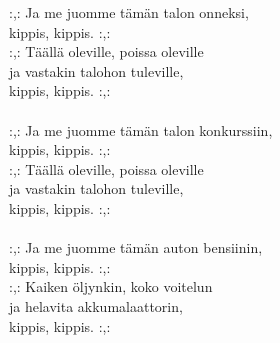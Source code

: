 
:,: Ja me juomme tämän talon onneksi, \\ kippis, kippis. :,: \\ :,: Täällä oleville, poissa oleville \\ ja vastakin talohon tuleville, \\ kippis, kippis. :,: \\ \hspace{10mm} \\ :,: Ja me juomme tämän talon konkurssiin, \\ kippis, kippis. :,: \\ :,: Täällä oleville, poissa oleville \\ ja vastakin talohon tuleville, \\ kippis, kippis. :,: \\ \hspace{10mm} \\ :,: Ja me juomme tämän auton bensiinin, \\ kippis, kippis. :,: \\ :,: Kaiken öljynkin, koko voitelun \\ ja helavita akkumalaattorin, \\ kippis, kippis. :,: